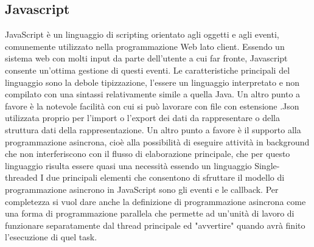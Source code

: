 {\subsection{Javascript}
JavaScript è un linguaggio di scripting orientato agli oggetti e agli eventi, comunemente utilizzato nella programmazione Web lato client. Essendo un sistema web con molti input da parte dell'utente a cui far fronte, Javascript consente un'ottima gestione di questi eventi. Le caratteristiche principali del linguaggio sono la debole tipizzazione, l'essere un linguaggio interpretato e non compilato con una sintassi relativamente simile a quella Java. Un altro punto a favore è la notevole facilità con cui si può lavorare con file con estensione .Json utilizzata proprio per l'import o l'export dei dati da rappresentare o della struttura dati della rappresentazione.
Un altro punto a favore è il supporto alla programmazione asincrona, cioè alla possibilità di eseguire attività in background che non interferiscono con il flusso di elaborazione principale, che per questo linguaggio risulta essere quasi una necessità essendo un linguaggio Single-threaded I due principali elementi che consentono di sfruttare il modello di programmazione asincrono in JavaScript sono gli eventi e le callback. Per completezza si vuol dare anche la definizione di programmazione asincrona come una forma di programmazione parallela che permette ad un’unità di lavoro di funzionare separatamente dal thread principale ed "avvertire" quando avrà finito l'esecuzione di quel task.

}
